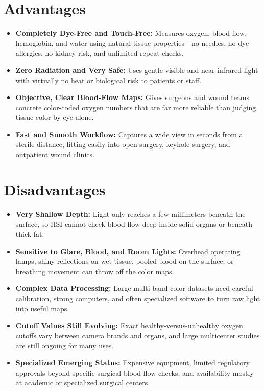 \section{Advantages}
\begin{itemize}
    \item \textbf{Completely Dye-Free and Touch-Free:} Measures oxygen, blood flow, hemoglobin, and water using natural tissue properties---no needles, no dye allergies, no kidney risk, and unlimited repeat checks.
    \item \textbf{Zero Radiation and Very Safe:} Uses gentle visible and near-infrared light with virtually no heat or biological risk to patients or staff.
    \item \textbf{Objective, Clear Blood-Flow Maps:} Gives surgeons and wound teams concrete color-coded oxygen numbers that are far more reliable than judging tissue color by eye alone.
    \item \textbf{Fast and Smooth Workflow:} Captures a wide view in seconds from a sterile distance, fitting easily into open surgery, keyhole surgery, and outpatient wound clinics.
\end{itemize}

\section{Disadvantages}
\begin{itemize}
    \item \textbf{Very Shallow Depth:} Light only reaches a few millimeters beneath the surface, so HSI cannot check blood flow deep inside solid organs or beneath thick fat.
    \item \textbf{Sensitive to Glare, Blood, and Room Lights:} Overhead operating lamps, shiny reflections on wet tissue, pooled blood on the surface, or breathing movement can throw off the color maps.
    \item \textbf{Complex Data Processing:} Large multi-band color datasets need careful calibration, strong computers, and often specialized software to turn raw light into useful maps.
    \item \textbf{Cutoff Values Still Evolving:} Exact healthy-versus-unhealthy oxygen cutoffs vary between camera brands and organs, and large multicenter studies are still ongoing for many uses.
    \item \textbf{Specialized Emerging Status:} Expensive equipment, limited regulatory approvals beyond specific surgical blood-flow checks, and availability mostly at academic or specialized surgical centers.
\end{itemize}


